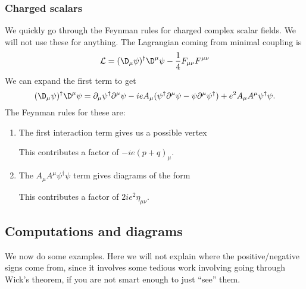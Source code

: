 \documentclass[a4paper]{article}
\begin{document}
\subsubsection*{Charged scalars}
We quickly go through the Feynman rules for charged complex scalar fields. We will not use these for anything. The Lagrangian coming from minimal coupling is
\[
  \mathcal{L} = (\D_\mu \psi)^\dagger \D^\mu \psi - \frac{1}{4} F_{\mu\nu}F^{\mu\nu}
\]
We can expand the first term to get
\[
  (\D_\mu \psi)^\dagger \D^\mu \psi = \partial_\mu \psi^\dagger \partial^\mu \psi - ie A_\mu(\psi^\dagger \partial^\mu \psi - \psi \partial^\mu \psi^\dagger) + e^2 A_\mu A^\mu \psi^\dagger \psi.
\]
The Feynman rules for these are:
\begin{enumerate}
  \item The first interaction term gives us a possible vertex
    \begin{center}
    \end{center}
    This contributes a factor of $-ie(p + q)_\mu$.
  \item The $A_\mu A^\mu \psi^\dagger \psi$ term gives diagrams of the form
    \begin{center}
    \end{center}
    This contributes a factor of $2ie^2 \eta_{\mu\nu}$.
\end{enumerate}

\subsection{Computations and diagrams}
We now do some examples. Here we will not explain where the positive/negative signs come from, since it involves some tedious work involving going through Wick's theorem, if you are not smart enough to just ``see'' them.
\end{document}

